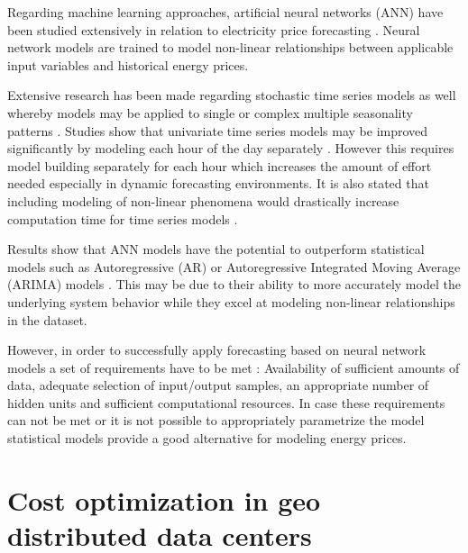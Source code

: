 Regarding machine learning approaches, artificial neural networks (ANN) have been studied extensively in relation to electricity price forecasting \cite{vahidinasab2008day, singhal2011electricity, pao2007forecasting, amjady2006day, catalao2007short, 
gareta2006forecasting, duanelectricity, szkuta1999electricity}. Neural network models are trained to model non-linear relationships between applicable input variables and historical energy prices. 

Extensive research has been made regarding stochastic time series models as well whereby models may be applied to single \cite{garcia2005garch, weron2008forecastingWh, weron2008forecasting, nogales2002forecasting, cuaresma2004forecasting, tan2010day, conejo2005day} or complex multiple seasonality patterns \cite{de2011forecasting, gould2008forecasting, zivot2003vector}. 
Studies show that univariate time series models may be improved significantly by modeling each hour of the day separately \cite{cuaresma2004forecasting, weron2008forecasting}. However this requires model building separately for each hour which increases the amount of effort needed especially in dynamic forecasting environments. 
It is also stated that including modeling of non-linear phenomena would drastically increase computation time for time series models \cite{cuaresma2004forecasting}. 


Results show that ANN models have the potential to outperform statistical models such as Autoregressive (AR) or Autoregressive Integrated Moving Average (ARIMA) models \cite{pao2007forecasting, catalao2007short}. This may be due to their ability to more accurately model the underlying system behavior while they excel at modeling non-linear relationships in the dataset. 

However, in order to successfully apply forecasting based on neural network models a set of requirements have to be met \cite{catalao2007short}: Availability of sufficient amounts of data, adequate selection of input/output samples, an appropriate number of hidden units and sufficient computational resources. In case these requirements can not be met or it is not possible to appropriately parametrize the model statistical models provide a good alternative for modeling energy prices. 




\section{Cost optimization in geo distributed data centers}

